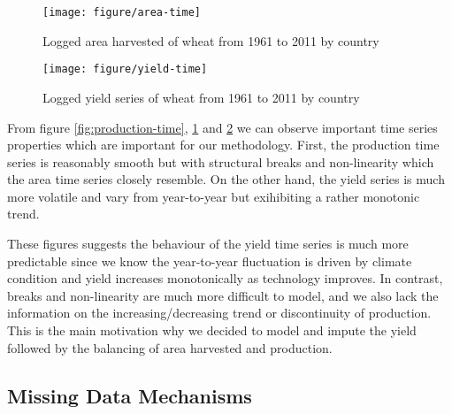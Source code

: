 \documentclass[nojss]{jss}\usepackage[]{graphicx}\usepackage[]{color}
\makeatletter
\def\maxwidth{ %
  \ifdim\Gin@nat@width>\linewidth
    \linewidth
  \else
    \Gin@nat@width
  \fi
}
\newenvironment{knitrout}{}{} %
\makeatother
\begin{document}
\begin{knitrout}
\color{fgcolor}\begin{figure}[!ht]


{\centering \texttt{[image: figure/area-time]} 

}

\caption[Logged area harvested of wheat from 1961 to 2011 by country]{Logged area harvested of wheat from 1961 to 2011 by country\label{fig:area-time}}
\end{figure}


\end{knitrout}


\begin{knitrout}
\color{fgcolor}\begin{figure}[!ht]


{\centering \texttt{[image: figure/yield-time]} 

}

\caption[Logged yield series of wheat from 1961 to 2011 by country]{Logged yield series of wheat from 1961 to 2011 by country\label{fig:yield-time}}
\end{figure}


\end{knitrout}


From figure \ref{fig:production-time}, \ref{fig:area-time} and
\ref{fig:yield-time} we can observe important time series properties
which are important for our methodology. First, the production time
series is reasonably smooth but with structural breaks and
non-linearity which the area time series closely resemble. On the
other hand, the yield series is much more volatile and vary from
year-to-year but exihibiting a rather monotonic trend.

These figures suggests the behaviour of the yield time series is much
more predictable since we know the year-to-year fluctuation is driven
by climate condition and yield increases monotonically as technology
improves. In contrast, breaks and non-linearity are much more
difficult to model, and we also lack the information on the
increasing/decreasing trend or discontinuity of production. This is
the main motivation why we decided to model and impute the yield
followed by the balancing of area harvested and production.

\FloatBarrier
\subsection{Missing Data Mechanisms}
\end{document}
